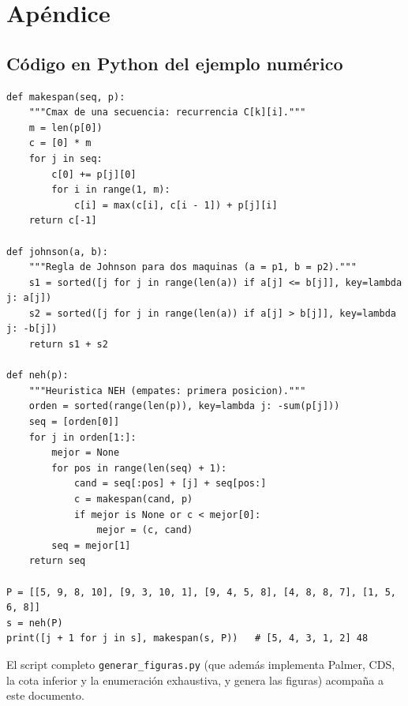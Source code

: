 \section{Apéndice}
\subsection{Código en Python del ejemplo numérico}

\begin{singlespace}
\begin{lstlisting}
def makespan(seq, p):
    """Cmax de una secuencia: recurrencia C[k][i]."""
    m = len(p[0])
    c = [0] * m
    for j in seq:
        c[0] += p[j][0]
        for i in range(1, m):
            c[i] = max(c[i], c[i - 1]) + p[j][i]
    return c[-1]

def johnson(a, b):
    """Regla de Johnson para dos maquinas (a = p1, b = p2)."""
    s1 = sorted([j for j in range(len(a)) if a[j] <= b[j]], key=lambda j: a[j])
    s2 = sorted([j for j in range(len(a)) if a[j] > b[j]], key=lambda j: -b[j])
    return s1 + s2

def neh(p):
    """Heuristica NEH (empates: primera posicion)."""
    orden = sorted(range(len(p)), key=lambda j: -sum(p[j]))
    seq = [orden[0]]
    for j in orden[1:]:
        mejor = None
        for pos in range(len(seq) + 1):
            cand = seq[:pos] + [j] + seq[pos:]
            c = makespan(cand, p)
            if mejor is None or c < mejor[0]:
                mejor = (c, cand)
        seq = mejor[1]
    return seq

P = [[5, 9, 8, 10], [9, 3, 10, 1], [9, 4, 5, 8], [4, 8, 8, 7], [1, 5, 6, 8]]
s = neh(P)
print([j + 1 for j in s], makespan(s, P))   # [5, 4, 3, 1, 2] 48
\end{lstlisting}
\end{singlespace}

\noindent El script completo \texttt{generar\_figuras.py} (que además implementa Palmer,
CDS, la cota inferior y la enumeración exhaustiva, y genera las figuras) acompaña a este
documento.


